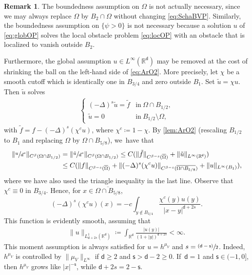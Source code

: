 \documentclass[10pt]{amsart}
\newcommand{\psfrac}[2]{\sfrac{(#1)}{#2}}
\theoremstyle{plain}
\theoremstyle{definition}
\newtheorem{remark}[thm]{Remark}
\newcommand{\R}{{\mathbb{R}}}
\let\be\beta
\let\ol\overline
\let\tl\tilde
\renewcommand{\d}{\mathsf{d}}
\newcommand{\s}{\mathsf{s}}
\begin{document}
\begin{remark}\label{rem:ArO2}
The boundedness assumption on $\Omega$ is not actually necessary, since we may always replace $\Omega$ by $B_2\cap \Omega$ without changing \eqref{eq:SchaBVP}. Similarly, the boundedness assumption on $\{\psi>0\}$ is not necessary because a solution $u$ of \eqref{eq:globOP} solves the local obstacle problem \eqref{eq:locOP} with an obstacle that is localized to vanish outside $B_2$.

Furthermore, the global assumption ${u\in L^\infty(\R^\d)}$ may be removed at the cost of shrinking the ball on the left-hand side {of \eqref{eq:ArO2}}. More precisely, let $\chi$ be a smooth cutoff which is identically one in $B_{3/4}$ and zero outside $B_1$. Set $\tl u = \chi u$. Then $\tl{u}$ solves
\begin{equation}
\begin{aligned}\label{eq:SchaBVP'}
\begin{cases}
(-\Delta)^s\tl{u} = \tl{f} & \text{in} \ \Omega\cap B_{1/2},\\
\tl{u} = 0 & \text{in} \ B_{1/2}\setminus\Omega,
\end{cases}
\end{aligned}
\end{equation}
with $\tl{f} = f - (-\Delta)^s(\chi^c u)$, where $\chi^c \coloneqq 1-\chi$. By \cref{lem:ArO2} (rescaling $B_{1/2}$ to $B_1$ and replacing $\Omega$ by $\Omega\cap B_{5/8}$), we~have that
\begin{align*}
\|\sfrac{u}{d^s}\|_{C^\be({\Omega}\cap B_{1/2})} &= \|\sfrac{\tl{u}}{d^s}\|_{C^\be({\Omega}\cap B_{1/2})} \le C(\|\tl{f}\|_{C^{\be-s}(\ol\Omega)} + \|\tl{u}\|_{L^\infty(\R^\d)})\\
&\le C(\|f\|_{C^{\be-s}(\ol\Omega)} + \|(-\Delta)^s(\chi^c u)\|_{C^{\be-s}(\ol{\Omega \cap B_{5/8}})} + \|u\|_{L^\infty(B_1)}),
\end{align*}
where we have also used the triangle inequality in the last line. Observe that $\chi^c \equiv 0$ in $B_{3/4}$. Hence, for $x\in \ol{\Omega \cap B_{5/8}}$,
\begin{equation}\label{eq:Deltaschic}
(-\Delta)^s(\chi^c u)(x) = -c\int_{y\notin B_{3/4}} \frac{\chi^c(y)u(y)}{|x-y|^{\d+2s}}.
\end{equation}
This function is evidently smooth, assuming that
\begin{align*}
\|u\|_{L_{\d+2s}^1(\R^\d)} \coloneqq \int_{\R^\d}\frac{|u(y)|}{(1+|y|)^{\d+2s}}<\infty.
\end{align*}
{This moment assumption is always satisfied for $u=h^{\mu_V}$ and $s=\psfrac{\d-\s}{2}$. Indeed, $h^{\mu_V}$ is controlled by $\|\mu_V\|_{L^\infty}$ if $\d\ge 2$ and $\s>\d-2\ge 0$. If~$\d=1$ and $\s \in (-1,0]$, then $h^{\mu_V}$ grows like $|x|^{-\s}$, while $\d+2s = 2-\s$.}
\end{remark}
\end{document}
